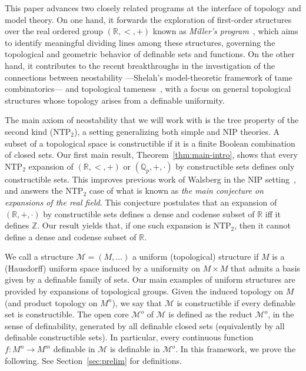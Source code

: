 \documentclass[12pt]{article}
\newcommand{\Mm}{\mathcal{M}}
\newcommand{\R}{\mathbb{R}}
\newcommand{\Z}{\mathbb{Z}}
\newcommand{\Q}{\mathbb{Q}}
\newcommand{\NIP}{\ensuremath{\mathrm{NIP}}}
\newcommand{\NTP}{\ensuremath{\mathrm{NTP}_2}}
\newcommand{\Mo}{\Mm^o}%
\theoremstyle{definition}
\theoremstyle{remark}
\begin{document}
This paper advances two closely related programs at the interface of topology and model theory. On one hand, it forwards the exploration of first-order structures over the real ordered group $(\R,<,+)$ known as \emph{Miller's program}~\cite{MS99, miller05-tame, DMS10}, which aims to identify meaningful dividing lines among these structures, governing the topological and geometric behavior of definable sets and functions. On the other hand, it contributes to the recent breakthroughs in the investigation of the connections between neostability ---Shelah's model-theoretic framework of tame combinatorics--- and topological tameness~\cite{DG17, HW18, Wal22}, with a focus on general topological structures whose topology arises from a definable uniformity. 

The main axiom of neostability that we will work with is the tree property of the second kind ($\NTP$), a setting generalizing both simple and $\NIP$ theories. A subset of a topological space is constructible if it is a finite Boolean combination of closed sets. Our first main result, Theorem~\ref{thm:main-intro}, shows that every $\NTP$ expansion of $(\R,<,+)$ or $(\Q_p, +, \cdot)$ by constructible sets defines only constructible sets. This improves previous work of Walsberg in the $\NIP$ setting~\cite{Wal22}, and answers the $\NTP$ case of what is known as \emph{the main conjecture on expansions of the real field}. This conjecture postulates that an expansion of $(\R,+,\cdot)$ by constructible sets defines a dense and codense subset of $\R$ iff it defines $\Z$. Our result yields that, if one such expansion is $\NTP$, then it cannot define a dense and codense subset of $\R$.

We call a structure $\Mm=(M,\ldots)$ a uniform (topological) structure if $M$ is a (Hausdorff) uniform space induced by a uniformity on $M\times M$ that admits a basis given by a definable family of sets. Our main examples of uniform structures are provided by expansions of topological groups. Given the induced topology on $M$ (and product topology on $M^n$), we say that $\Mm$ is constructible if every definable set is constructible. The open core $\Mo$ of $\Mm$ is defined as the reduct $\Mo$, in the sense of definability, generated by all definable closed sets (equivalently by all definable constructible sets). In particular, every continuous function $f:M^n \rightarrow M^m$ definable in $\Mm$ is definable in $\Mo$. In this framework, we prove the following. See Section~\ref{sec:prelim} for definitions. 
\end{document}
